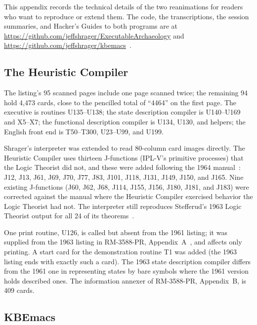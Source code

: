 \documentclass[11pt]{article}
\begin{document}
This appendix records the technical details of the two reanimations
for readers who want to reproduce or extend them. The code, the
transcriptions, the session summaries, and Hacker's Guides to both
programs are at \url{https://github.com/jeffshrager/ExecutableArchaeology}
and \url{https://github.com/jeffshrager/kbemacs}~\cite{earepo,kbemacsrepo}.

\subsection{The Heuristic Compiler}
\label{app:hc}

The listing's 95 scanned pages include one page scanned twice; the
remaining 94 hold 4,473 cards, close to the pencilled total of ``4464''
on the first page. The executive is routines U135--U138; the state
description compiler is U140--U169 and X5--X7; the functional
description compiler is U134, U130, and helpers; the English front end
is T50--T300, U23--U99, and U199.

Shrager's interpreter was extended to read 80-column card images
directly. The Heuristic Compiler uses thirteen J-functions (IPL-V's
primitive processes) that the Logic Theorist did not, and these were
added following the 1964 manual~\cite{newell1964ipl}: J12, J13, J61,
J69, J70, J77, J83, J101, J118, J131, J149, J150, and J165. Nine
existing J-functions (J60, J62, J68, J114, J155, J156, J180, J181, and
J183) were corrected against the manual where the Heuristic Compiler
exercised behavior the Logic Theorist had not. The interpreter still
reproduces Stefferud's 1963 Logic Theorist output for all 24 of its
theorems~\cite{earepo}.

One print routine, U126, is called but absent from the 1961 listing; it
was supplied from the 1963 listing in RM-3588-PR,
Appendix~A~\cite{simonRM3588}, and affects only printing. A start card
for the demonstration routine T1 was added (the 1963 listing ends with
exactly such a card). The 1963 state description compiler differs from
the 1961 one in representing states by bare symbols where the 1961
version holds described ones. The information annexer of RM-3588-PR,
Appendix~B, is 409 cards.

\subsection{KBEmacs}
\label{app:kbe}
\end{document}
